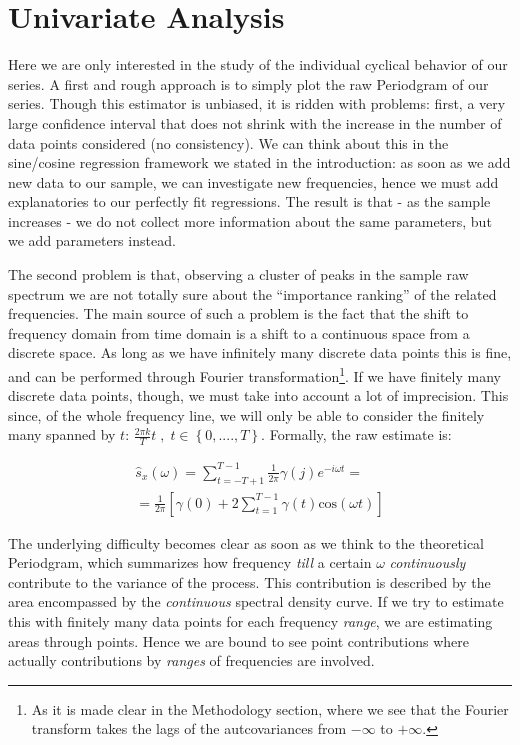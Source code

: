 \documentclass[12pt]{article} %
\begin{document}
\section{Univariate Analysis}

Here we are only interested in the study of the individual cyclical behavior of our series. A first and rough approach is to simply plot the raw Periodgram of our series. Though this estimator is unbiased, it is ridden with problems: first, a very large confidence interval that does not shrink with the increase in the number of data points considered (no consistency). We can think about this in the sine/cosine regression framework we stated in the introduction: as soon as we add new data to our sample, we can investigate new frequencies, hence we must add explanatories to our perfectly fit regressions.  The result is that - as the sample increases - we do not collect more information about the same parameters, but we add parameters instead.

The second problem is that, observing a cluster of peaks in the sample raw spectrum we are not totally sure about the ``importance ranking'' of the related frequencies. The main source of such a problem is the fact that the shift to frequency domain from time domain is a shift to a continuous space from a discrete space. As long as we have infinitely many discrete data points this is fine, and can be performed through Fourier transformation\footnote{As it is made clear in the Methodology section, where we see that the Fourier transform takes the lags of the autcovariances from $-\infty$ to $+\infty$.}. If we have finitely many discrete data points, though, we must take into account a lot of imprecision. This since, of the whole frequency line, we will only be able to consider the finitely many spanned by $t$: $\frac{2\pi k}{T}t\;,\;t\in\left\{0,....,T\right\}$. Formally, the raw estimate is:

\begin{equation}
\begin{aligned}
\hat{s}_x(\omega)=\sum\limits_{t=-T+1}^{T-1} \frac{1}{2\pi} \gamma(j)e^{-i\omega t}=\\
=\frac{1}{2\pi}\left[\gamma(0)+2\sum\limits_{t=1}^{T-1} \gamma(t)\text{cos}(\omega t)\right]
\end{aligned}
\end{equation}

The underlying difficulty becomes clear as soon as we think to the theoretical Periodgram, which summarizes how frequency {\em till} a certain $\omega$ {\em continuously} contribute to the variance of the process. This contribution is described by the area encompassed by the {\em continuous} spectral density curve. If we try to estimate this with finitely many data points for each frequency {\em range}, we are estimating areas through points. Hence we are bound to see point contributions where actually contributions by {\em ranges} of frequencies are involved.
\end{document}
